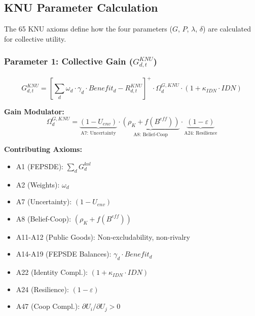 \subsection{KNU Parameter Calculation}

The 65 KNU axioms define how the four parameters ($G$, $P$, $\lambda$, $\delta$) 
are calculated for collective utility.

\subsubsection{Parameter 1: Collective Gain ($G^{KNU}_{d,t}$)}

\begin{tcolorbox}[colback=green!5!white, colframe=green!50!black]
\begin{equation}
\boxed{
G^{KNU}_{d,t} = \left[ \sum_d \omega_d \cdot \gamma_d \cdot Benefit_d - R^{KNU}_{d,t} \right]^{+} \cdot \Omega^{G,KNU}_d \cdot (1 + \kappa_{IDN} \cdot IDN)
}
\end{equation}
\end{tcolorbox}

\textbf{Gain Modulator:}
\begin{equation}
\Omega^{G,KNU}_d = \underbrace{(1 - U_{env})}_{\text{A7: Uncertainty}} \cdot 
                   \underbrace{(\rho_K + f(B^{eff}))}_{\text{A8: Belief-Coop}} \cdot 
                   \underbrace{(1 - \varepsilon)}_{\text{A24: Resilience}}
\end{equation}

\textbf{Contributing Axioms:} 
\begin{itemize}
\item A1 (FEPSDE): $\sum_d G_d^{kol}$
\item A2 (Weights): $\omega_d$
\item A7 (Uncertainty): $(1 - U_{env})$
\item A8 (Belief-Coop): $(\rho_K + f(B^{eff}))$
\item A11-A12 (Public Goods): Non-excludability, non-rivalry
\item A14-A19 (FEPSDE Balances): $\gamma_d \cdot Benefit_d$
\item A22 (Identity Compl.): $(1 + \kappa_{IDN} \cdot IDN)$
\item A24 (Resilience): $(1 - \varepsilon)$
\item A47 (Coop Compl.): $\partial U_i / \partial U_j > 0$
\end{itemize}

